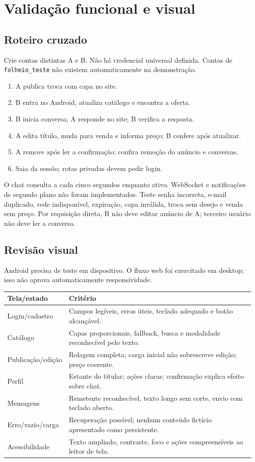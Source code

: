 \documentclass[11pt,a4paper]{article}
\begin{document}
\section{Validação funcional e visual}\label{sec:qualidade}
\subsection{Roteiro cruzado}
Crie contas distintas A e B. Não há credencial universal definida. Contas de \texttt{folheio\_teste} não existem automaticamente na demonstração.
\begin{enumerate}
\item A publica troca com capa no site.
\item B entra no Android, atualiza catálogo e encontra a oferta.
\item B inicia conversa; A responde no site; B verifica a resposta.
\item A edita título, muda para venda e informa preço; B confere após atualizar.
\item A remove após ler a confirmação; confira remoção do anúncio e conversas.
\item Saia da sessão; rotas privadas devem pedir login.
\end{enumerate}
O chat consulta a cada cinco segundos enquanto ativo. WebSocket e notificações de segundo plano não foram implementados.
Teste senha incorreta, e-mail duplicado, rede indisponível, expiração, capa inválida, troca sem desejo e venda sem preço. Por requisição direta, B não deve editar anúncio de A; terceiro usuário não deve ler a conversa.
\subsection{Revisão visual}
Android precisa de teste em dispositivo. O fluxo web foi exercitado em desktop; isso não aprova automaticamente responsividade.
\par\medskip\noindent\begin{tabularx}{\textwidth}{@{}p{31mm}Y@{}}\toprule Tela/estado & Critério\\\midrule
Login/cadastro & Campos legíveis, erros úteis, teclado adequado e botão alcançável.\\
Catálogo & Capas proporcionais, fallback, busca e modalidade reconhecível pelo texto.\\
Publicação/edição & Rolagem completa; carga inicial não sobrescreve edição; preço coerente.\\
Perfil & Estante do titular; ações claras; confirmação explica efeito sobre chat.\\
Mensagens & Remetente reconhecível, texto longo sem corte, envio com teclado aberto.\\
Erro/vazio/carga & Recuperação possível; nenhum conteúdo fictício apresentado como persistente.\\
Acessibilidade & Texto ampliado, contraste, foco e ações compreensíveis ao leitor de tela.\\\bottomrule\end{tabularx}\par\medskip
\end{document}
